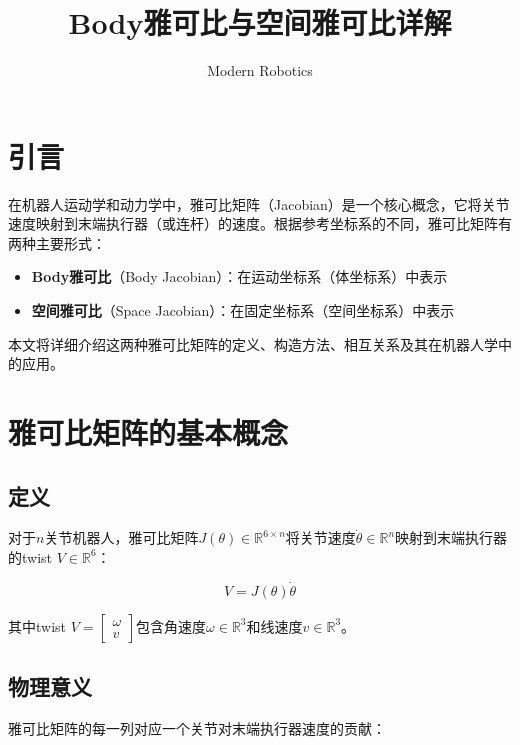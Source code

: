 \documentclass[12pt,a4paper]{article}
\title{Body雅可比与空间雅可比详解}
\author{Modern Robotics}
\date{}
\begin{document}
\maketitle

\tableofcontents
\newpage

\section{引言}

在机器人运动学和动力学中，雅可比矩阵（Jacobian）是一个核心概念，它将关节速度映射到末端执行器（或连杆）的速度。根据参考坐标系的不同，雅可比矩阵有两种主要形式：

\begin{itemize}
\item \textbf{Body雅可比}（Body Jacobian）：在运动坐标系（体坐标系）中表示
\item \textbf{空间雅可比}（Space Jacobian）：在固定坐标系（空间坐标系）中表示
\end{itemize}

本文将详细介绍这两种雅可比矩阵的定义、构造方法、相互关系及其在机器人学中的应用。

\section{雅可比矩阵的基本概念}

\subsection{定义}

对于$n$关节机器人，雅可比矩阵$J(\theta) \in \mathbb{R}^{6 \times n}$将关节速度$\dot{\theta} \in \mathbb{R}^n$映射到末端执行器的twist $V \in \mathbb{R}^6$：

\begin{equation}
V = J(\theta) \dot{\theta}
\label{eq:jacobian_basic}
\end{equation}

其中twist $V = \begin{bmatrix} \omega \\ v \end{bmatrix}$包含角速度$\omega \in \mathbb{R}^3$和线速度$v \in \mathbb{R}^3$。

\subsection{物理意义}

雅可比矩阵的每一列对应一个关节对末端执行器速度的贡献：
\end{document}
